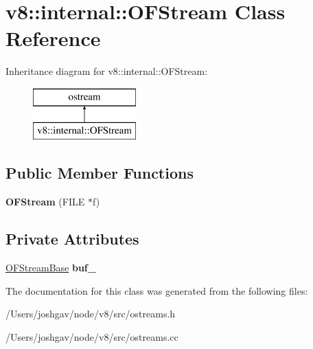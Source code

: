 \hypertarget{classv8_1_1internal_1_1_o_f_stream}{}\section{v8\+:\+:internal\+:\+:O\+F\+Stream Class Reference}
\label{classv8_1_1internal_1_1_o_f_stream}
Inheritance diagram for v8\+:\+:internal\+:\+:O\+F\+Stream\+:\begin{figure}[H]
\begin{center}
\leavevmode
\includegraphics[height=2.000000cm]{classv8_1_1internal_1_1_o_f_stream}
\end{center}
\end{figure}
\subsection*{Public Member Functions}
\begin{DoxyCompactItemize}
\item 
{\bfseries O\+F\+Stream} (F\+I\+LE $\ast$f)\hypertarget{classv8_1_1internal_1_1_o_f_stream_ab570d7dfbde721ff8f96c9a7ae8f9c5f}{}\label{classv8_1_1internal_1_1_o_f_stream_ab570d7dfbde721ff8f96c9a7ae8f9c5f}

\end{DoxyCompactItemize}
\subsection*{Private Attributes}
\begin{DoxyCompactItemize}
\item 
\hyperlink{classv8_1_1internal_1_1_o_f_stream_base}{O\+F\+Stream\+Base} {\bfseries buf\+\_\+}\hypertarget{classv8_1_1internal_1_1_o_f_stream_a6102e371897e5b9d34aabe31dbbc6b8a}{}\label{classv8_1_1internal_1_1_o_f_stream_a6102e371897e5b9d34aabe31dbbc6b8a}

\end{DoxyCompactItemize}


The documentation for this class was generated from the following files\+:\begin{DoxyCompactItemize}
\item 
/\+Users/joshgav/node/v8/src/ostreams.\+h\item 
/\+Users/joshgav/node/v8/src/ostreams.\+cc\end{DoxyCompactItemize}

